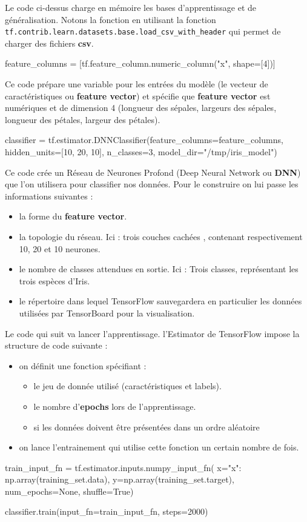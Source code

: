 \documentclass[a4paper,11pt]{book}
\theoremstyle{theo}
\begin{document}
Le code ci-dessus charge en mémoire les bases d'apprentissage et de généralisation. Notons la fonction en utilisant la fonction \verb+tf.contrib.learn.datasets.base.load_csv_with_header+ qui permet de charger des fichiers \textbf{csv}.
\begin{mypython}
feature_columns = [tf.feature_column.numeric_column("x", shape=[4])]
\end{mypython}
Ce code prépare une variable pour les entrées du modèle (le vecteur de caractéristiques ou \textbf{feature vector}) et spécifie que \textbf{feature vector} est numériques et de dimension 4 (longueur des sépales, largeurs des sépales, longueur des pétales, largeur des pétales).

\begin{mypython}
classifier = tf.estimator.DNNClassifier(feature_columns=feature_columns,
                                          hidden_units=[10, 20, 10],
                                          n_classes=3,
                                          model_dir="/tmp/iris_model")
\end{mypython}
Ce code crée un Réseau de Neurones Profond (Deep Neural Network ou \textbf{DNN}) que l'on utilisera pour classifier nos données. Pour le construire on lui passe les informations suivantes :
\begin{itemize}
\item la forme du \textbf{feature vector}.
\item la topologie du réseau. Ici : trois couches cachées , contenant respectivement 10, 20 et 10 neurones.
\item le nombre de classes attendues en sortie. Ici : Trois classes, représentant les trois espèces d'Iris.
\item le répertoire dans lequel TensorFlow sauvegardera en particulier les données utilisées par  TensorBoard pour la visualisation.
\end{itemize}

Le code qui suit va lancer l'apprentissage. l'Estimator de TensorFlow impose la structure de code suivante :
\begin{itemize}
	\item on définit une fonction spécifiant :
	\begin{itemize}	
		\item le jeu de donnée utilisé (caractéristiques et labels).
		\item le nombre d'\textbf{epochs} lors de l'apprentissage.
		\item si les données doivent être présentées dans un ordre aléatoire
	\end{itemize}
	\item on lance l'entrainement qui utilise cette fonction un certain nombre de fois.
\end{itemize}
\begin{mypython}
train_input_fn = tf.estimator.inputs.numpy_input_fn(
      x={"x": np.array(training_set.data)},
      y=np.array(training_set.target),
      num_epochs=None,
      shuffle=True)

classifier.train(input_fn=train_input_fn, steps=2000)
\end{mypython}
\end{document}
